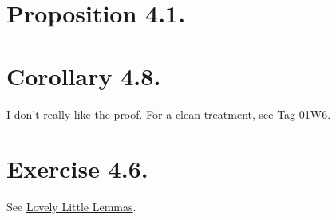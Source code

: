 \section{Proposition 4.1.}

\section{Corollary 4.8.}

I don't really like the proof. 
For a clean treatment, see \href{https://stacks.math.columbia.edu/tag/01W6}{Tag 01W6}.

\section{Exercise 4.6.}

See \href{https://lovelylittlelemmas.rjprojects.net/proper-affine-finite/}{Lovely Little Lemmas}.